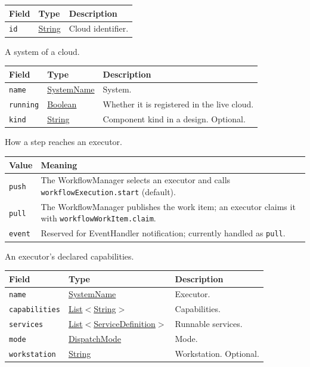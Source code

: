 \documentclass[a4paper]{arrowhead}
\newcommand{\mref}[1]{{\textcolor{ArrowheadPurple}{\hyperref[sec:model:#1]{#1}}}}
\newcommand{\pref}[1]{{\textcolor{ArrowheadGrey}{\hyperref[sec:model:primitives:#1]{#1}}}}
\begin{document}
{\small
\begin{longtable}{|p{3.9cm}|p{4.4cm}|p{7.5cm}|}

\hline
\rowcolor{gray!33} Field & Type & Description \\ \hline
\endhead
\texttt{id} & \pref{String} & Cloud identifier. \\ \hline
\end{longtable}
}

A system of a cloud.

{\small
\begin{longtable}{|p{3.9cm}|p{4.4cm}|p{7.5cm}|}

\hline
\rowcolor{gray!33} Field & Type & Description \\ \hline
\endhead
\texttt{name} & \pref{SystemName} & System. \\ \hline
\texttt{running} & \pref{Boolean} & Whether it is registered in the live cloud. \\ \hline
\texttt{kind} & \pref{String} & Component kind in a design. Optional. \\ \hline
\end{longtable}
}

How a step reaches an executor.

{\small
\begin{longtable}{|p{3.9cm}|p{11.9cm}|}

\hline
\rowcolor{gray!33} Value & Meaning \\ \hline
\endhead
\texttt{push} & The WorkflowManager selects an executor and calls \texttt{workflowExecution.start} (default). \\ \hline
\texttt{pull} & The WorkflowManager publishes the work item; an executor claims it with \texttt{workflowWorkItem.claim}. \\ \hline
\texttt{event} & Reserved for EventHandler notification; currently handled as \texttt{pull}. \\ \hline
\end{longtable}
}

An executor's declared capabilities.

{\small
\begin{longtable}{|p{3.9cm}|p{4.4cm}|p{7.5cm}|}

\hline
\rowcolor{gray!33} Field & Type & Description \\ \hline
\endhead
\texttt{name} & \pref{SystemName} & Executor. \\ \hline
\texttt{capabilities} & \pref{List}$<$\pref{String}$>$ & Capabilities. \\ \hline
\texttt{services} & \pref{List}$<$\pref{ServiceDefinition}$>$ & Runnable services. \\ \hline
\texttt{mode} & \mref{DispatchMode} & Mode. \\ \hline
\texttt{workstation} & \pref{String} & Workstation. Optional. \\ \hline
\end{longtable}
}
\end{document}
